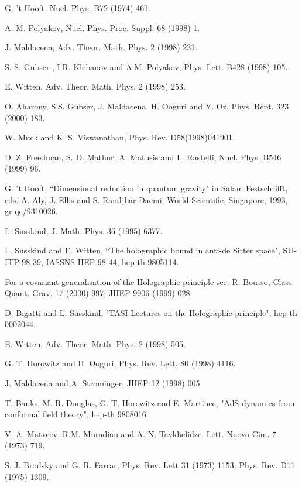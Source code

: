 \documentclass[a4paper,twocolumn,prd,groupedaddress,nofootinbib]{revtex4}
\begin{document}
\begin{thebibliography}{30}

 G. 't Hooft, Nucl. Phys. B72 (1974) 461.

 A. M. Polyakov, Nucl. Phys. Proc. Suppl. 68 (1998) 1.

 J. Maldacena, Adv. Theor. Math. Phys. 2 (1998) 231.

 S. S. Gubser , I.R. Klebanov and A.M. Polyakov, 
Phys. Lett. B428 (1998) 105.

 E. Witten, Adv. Theor. Math. Phys. 2 (1998) 253.

 O. Aharony, S.S. Gubser, J. Maldacena, 
H. Ooguri and Y. Oz, Phys. Rept. 323 (2000) 183.

 W. Muck and K. S. Viswanathan, Phys. Rev. D58(1998)041901.

 D. Z. Freedman, S. D. Mathur, A. Matusis and L. Rastelli,
Nucl. Phys. B546 (1999) 96.

 G. 't Hooft, ``Dimensional reduction in quantum gravity"
in Salam Festschrifft, eds. A. Aly, J. Ellis and S. Randjbar-Daemi,
 World Scientific, Singapore, 1993, gr-qc/9310026.

 L. Susskind, J. Math. Phys. 36 (1995) 6377.

 L. Susskind and E. Witten, ``The holographic bound in anti-de 
Sitter space", SU-ITP-98-39, IASSNS-HEP-98-44, hep-th 9805114.

 For a covariant generalisation of the Holographic principle see:
R. Bousso, Class. Quant. Grav. 17 (2000) 997; JHEP 9906 (1999) 028.

 D. Bigatti and L. Susskind,  "TASI Lectures on the Holographic principle",
hep-th 0002044.

 E. Witten, Adv. Theor. Math. Phys. 2 (1998) 505.

 G. T. Horowitz and H. Ooguri, Phys. Rev. Lett. 80 (1998) 4116.

 J. Maldacena and A. Strominger, JHEP 12 (1998) 005.

T. Banks, M. R. Douglas, G. T. Horowitz and E. Martinec,
"AdS dynamics from conformal field theory", hep-th 9808016.

 V. A. Matveev, R.M. Muradian and A. N. Tavkhelidze,
 Lett. Nuovo Cim. 7 (1973) 719.

 S. J. Brodsky and G. R. Farrar, Phys. Rev. Lett 31 (1973) 1153;
Phys. Rev. D11 (1975) 1309.


\end{thebibliography}
\end{document}
